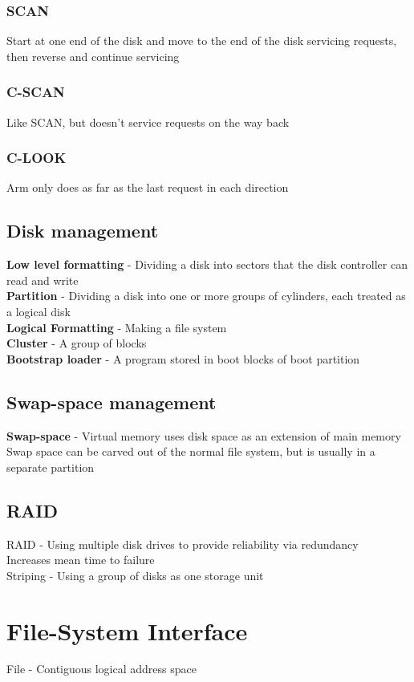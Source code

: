 \documentclass{article}[18pt]
\begin{document}
\subsubsection{SCAN}
Start at one end of the disk and move to the end of the disk servicing requests, then reverse and continue servicing
\subsubsection{C-SCAN}
Like SCAN, but doesn't service requests on the way back
\subsubsection{C-LOOK}
Arm only does as far as the last request in each direction
\subsection{Disk management}
\textbf{Low level formatting} - Dividing a disk into sectors that the disk controller can read and write\\
\textbf{Partition} - Dividing a disk into one or more groups of cylinders, each treated as a logical disk\\
\textbf{Logical Formatting} - Making a file system\\
\textbf{Cluster} - A group of blocks\\
\textbf{Bootstrap loader} - A program stored in boot blocks of boot partition
\subsection{Swap-space management}
\textbf{Swap-space} - Virtual memory uses disk space as an extension of main memory\\
Swap space can be carved out of the normal file system, but is usually in a separate partition\\
\subsection{RAID}
RAID - Using multiple disk drives to provide reliability via redundancy \\
Increases mean time to failure\\
Striping - Using a group of disks as one storage unit
\section{File-System Interface}
File - Contiguous logical address space
\end{document}
